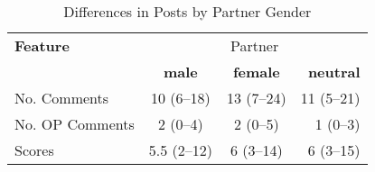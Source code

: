 \begin{table}[h!]
  \begin{center}
    \caption{Differences in Posts by Partner Gender}
    \label{tab:genderdiff}
    \begin{tabular}{l|c|c|r} %
    \hline
      \textbf{Feature} & \multicolumn{3}{c}{Partner} \\
       & \textbf{male} & \textbf{female} &\textbf{neutral}  \\
      \hline
      No. Comments  & 10 (6--18) & 13 (7--24) & 11 (5--21)\\
      No. OP Comments & 2 (0--4) & 2 (0--5) & 1 (0--3) \\
      Scores  & 5.5 (2--12) & 6 (3--14) & 6 (3--15)\\
      \hline
    \end{tabular}
  \end{center}  
\end{table}




